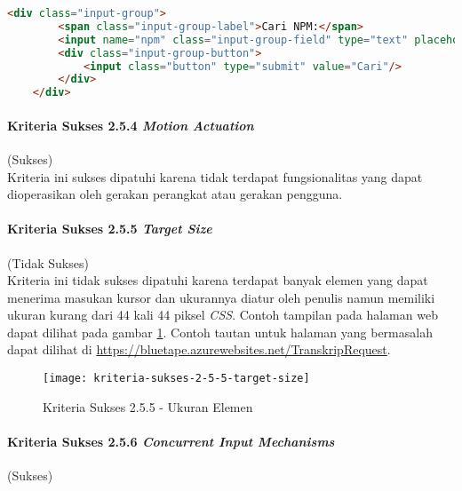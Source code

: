 \begin{lstlisting}[frame=single, label={lst:2.5.3_label_dan_nama_pada_komponen_masukan}, language=HTML, caption=Kriteria Sukses 2.5.3 - Label dan Nama Pada Komponen Masukan]
    <div class="input-group">
        <span class="input-group-label">Cari NPM:</span>
        <input name="npm" class="input-group-field" type="text" placeholder="2013730013" maxlength="10" minlength="10"<?= $npmQuery === NULL ? '' : " value='$npmQuery'" ?>/>
        <div class="input-group-button">
            <input class="button" type="submit" value="Cari"/>
        </div>
    </div>
\end{lstlisting}

\paragraph{Kriteria Sukses 2.5.4 \textit{Motion Actuation}}
\label{par:kepatuhan_bluetape_kriteria_sukses_2.5.4}
(Sukses)\\

Kriteria ini sukses dipatuhi karena tidak terdapat fungsionalitas yang dapat dioperasikan oleh gerakan perangkat atau gerakan pengguna.

\paragraph{Kriteria Sukses 2.5.5 \textit{Target Size}}
\label{par:kepatuhan_bluetape_kriteria_sukses_2.5.5}
(Tidak Sukses)\\

Kriteria ini tidak sukses dipatuhi karena terdapat banyak elemen yang dapat menerima masukan kursor dan ukurannya diatur oleh penulis namun memiliki ukuran kurang dari 44 kali 44 piksel \textit{CSS}. Contoh tampilan pada halaman web dapat dilihat pada gambar \ref{fig:2.5.5_target_size}. Contoh tautan untuk halaman yang bermasalah dapat dilihat di \url{https://bluetape.azurewebsites.net/TranskripRequest}.

\begin{figure}[H]
    \centering  
    \texttt{[image: kriteria-sukses-2-5-5-target-size]}  
    \caption[Kriteria Sukses 2.5.5 - Ukuran Elemen]{Kriteria Sukses 2.5.5 - Ukuran Elemen}
    \label{fig:2.5.5_target_size}  
\end{figure} 

\paragraph{Kriteria Sukses 2.5.6 \textit{Concurrent Input Mechanisms}}
\label{par:kepatuhan_bluetape_kriteria_sukses_2.5.6}
(Sukses)\\

